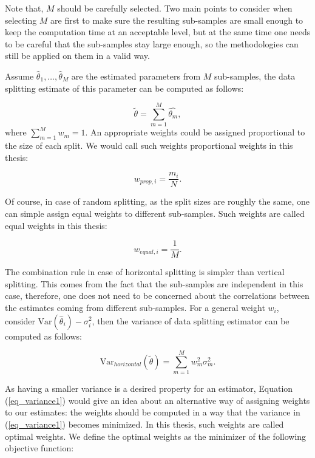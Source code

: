 \documentclass[11pt,a5paper,twoside]{book}
\begin{document}
Note that, $M$ should be carefully selected. Two main points to consider when selecting $M$ are first to make sure the resulting sub-samples are small enough to keep the computation time at an acceptable level, but at the same time one needs to be careful that the sub-samples stay large enough, so the methodologies can still be applied on them in a valid way.

Assume $\widehat{\theta}_1, \ldots, \widehat{\theta}_M$ are the estimated parameters from $M$ sub-samples, the data splitting estimate of this parameter can be computed as follows:

\begin{equation}
\label{eq_estimate}
\widetilde{\theta} = \sum_{m=1}^M \widehat{\theta_m},
\end{equation}
where $\sum_{m=1}^M w_m = 1$. An appropriate weights could be assigned proportional to the size of each split. We would call such weights proportional weights in this thesis:

\begin{equation}
\label{eq_prop_w} 
w_{prop, i} = \frac{m_i}{N}.
\end{equation}

Of course, in case of random splitting, as the split sizes are roughly the same, one can simple assign equal weights to different sub-samples. Such weights are called equal weights in this thesis:

\begin{equation}
\label{eq_equal_w}
w_{equal,i} = \frac{1}{M}.
\end{equation}

The combination rule in case of horizontal splitting is simpler than vertical splitting. This comes from the fact that the sub-samples are independent in this case, therefore, one does not need to be concerned about the correlations between the estimates coming from different sub-samples. For a general weight $w_i$, consider $\mathrm{Var}(\widehat{\theta}_i) - \sigma^2_i$, then the variance of data splitting estimator can be computed as follows:

\begin{equation}
\label{eq_variance1}
\mathrm{Var}_{horizontal}(\widetilde{\theta}) = \sum_{m=1}^M w_m^2 \sigma_m^2.
\end{equation}

As having a smaller variance is a desired property for an estimator, Equation (\ref{eq_variance1}) would give an idea about an alternative way of assigning weights to our estimates: the weights should be computed in a way that the variance in (\ref{eq_variance1}) becomes minimized. In this thesis, such weights are called optimal weights. We define the optimal weights as the minimizer of the following objective function:
\end{document}
